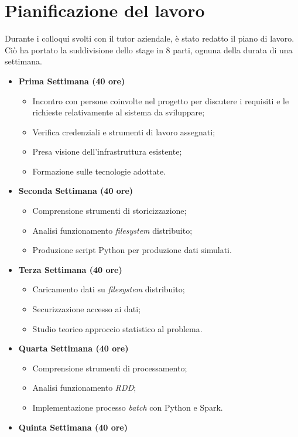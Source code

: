 \section{Pianificazione del lavoro}
Durante i colloqui svolti con il tutor aziendale, è stato redatto il piano di lavoro. Ciò ha portato la suddivisione dello stage in 8 parti, ognuna della durata di una settimana.
\begin{itemize}
	\item[] \textbf{Prima Settimana (40 ore)}
	\begin{itemize}
		\item Incontro con persone coinvolte nel progetto per discutere i requisiti e le richieste
		relativamente al sistema da sviluppare;
		\item Verifica credenziali e strumenti di lavoro assegnati;
		\item Presa visione dell’infrastruttura esistente;
		\item Formazione sulle tecnologie adottate.
	\end{itemize}
	\item[] \textbf{Seconda Settimana (40 ore)} 
	\begin{itemize}
		\item Comprensione strumenti di storicizzazione;
		\item Analisi funzionamento \emph{filesystem} distribuito;
		\item Produzione script Python per produzione dati simulati.
	\end{itemize}
	\item[] \textbf{Terza Settimana (40 ore)} 
	\begin{itemize}
		\item Caricamento dati su \emph{filesystem} distribuito;
		\item Securizzazione accesso ai dati;
		\item Studio teorico approccio statistico al problema.
	\end{itemize}
	\item[] \textbf{Quarta Settimana (40 ore)} 
	\begin{itemize}
		\item Comprensione strumenti di processamento;
		\item Analisi funzionamento \emph{RDD};
		\item Implementazione processo \emph{batch} con Python e Spark.        
	\end{itemize}
	\item[] \textbf{Quinta Settimana (40 ore)} 

\end{itemize}
